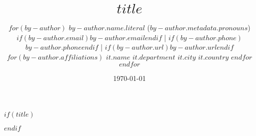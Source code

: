 $if(title)$\title{ \vspace{-1.5em}
\bf $title$ \vspace{-.5em} 
}$endif$
\author{
  $for(by-author)$
    {$by-author.name.literal$}\:
    ($by-author.metadata.pronouns$)
    \authorcr %
    $if(by-author.email)$\href{mailto:$by-author.email$}{$by-author.email$}$endif$\: |
    $if(by-author.phone)${$by-author.phone$}{}$endif$ |
    $if(by-author.url)$\href{$by-author.url$}{$by-author.url$}$endif$
    

    $for(by-author.affiliations)$
      $it.name$
      \authorcr
      $it.department$
      \authorcr
      $it.city$ $it.country$
    $endfor$
  $endfor$
  \date{\vspace{-1em}\today}
  }



